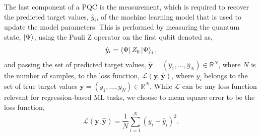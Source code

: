\documentclass[journal=jacsat,manuscript=article]{achemso}
\begin{document}
The last component of a PQC is the measurement, which is required to recover the predicted target values, $\hat{y}_{i}$, of the machine learning model that is used to update the model parameters.
This is performed by measuring the quantum state, $\ket{\Psi}$, using the Pauli Z operator on the first qubit denoted as,
\begin{equation}
	\hat{y}_{i} = \bra{\Psi}Z_{0}\ket{\Psi}_{i},
	\label{eq:y_pred}
\end{equation}
and passing the set of predicted target values, $\bm{\hat{y}} = (\hat{y}_{1}, \ldots, \hat{y}_{N}) \in \mathbb{R}^{N}$, where $N$ is the number of samples, to the loss function, $\mathcal{L}(\bm{y}, \bm{\hat y})$, where $y_{i}$ belongs to the set of true target values $\bm{y} = (y_{1}, \ldots, y_{N}) \in \mathbb{R}^{N}$.
While $\mathcal{L}$ can be any loss function relevant for regression-based ML tasks, we choose to mean square error to be the loss function,
\begin{equation}
	\mathcal{L}(\bm{y}, \bm{\hat y}) = \frac{1}{N} \sum_{i=1}^{N} (y_{i} - \hat{y}_{i})^{2}.
	\label{eq:isthisloss}
\end{equation}
\end{document}

